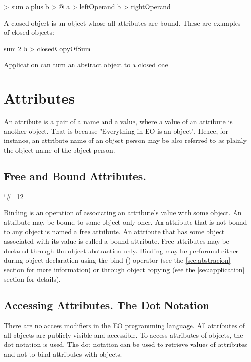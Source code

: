\documentclass[12pt]{book}
\begin{document}
\begin{ffcode}
[a b] > sum
  a.plus b > @
  a > leftOperand
  b > rightOperand
\end{ffcode}
A closed object is an object whose all attributes are bound.
These are examples of closed objects:

\begin{ffcode}
sum 2 5 > closedCopyOfSum
\end{ffcode}
Application can turn an abstract object to a closed one


\section{Attributes}

An attribute is a pair of a name and a value, where a value of an attribute is another object. That is because "Everything in EO is an object". Hence, for instance, an attribute name of an object person may be also referred to as plainly the object name of the object person.

\subsection{Free and Bound Attributes.} \label{subsec:free-bound-attr}

\catcode`\#=12\relax
{}

Binding is an operation of associating an attribute's value with some object. An attribute may be bound to some object only once.
An attribute that is not bound to any object is named a free attribute. An attribute that has some object associated with its value is called a bound attribute.
Free attributes may be declared through the object abstraction only. Binding may be performed either during object declaration using the bind (\ff{>}) operator (see the \ref{sec:abstracion} section for more information) or through object copying (see the \ref{sec:application} section for details).

\subsection{Accessing Attributes. The Dot Notation}
There are no access modifiers in the EO programming language. All attributes of all objects are publicly visible and accessible. To access attributes of objects, the dot notation is used. The dot notation can be used to retrieve values of attributes and not to bind attributes with objects.
\end{document}
